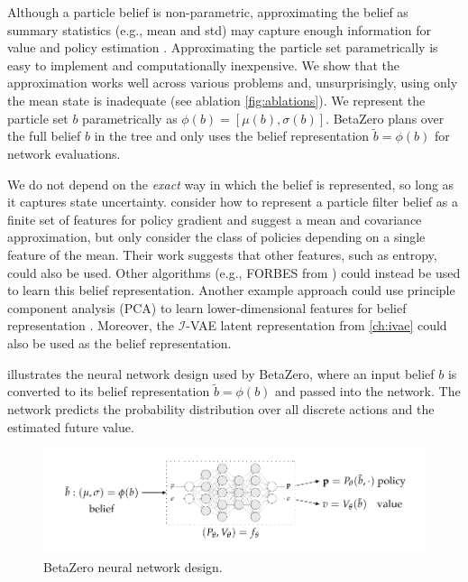 Although a particle belief is non-parametric, approximating the belief as summary statistics (e.g., mean and std) may capture enough information for value and policy estimation \cite{coquelin2008particle}.
Approximating the particle set parametrically is easy to implement and computationally inexpensive.
We show that the approximation works well across various problems and, unsurprisingly, using only the mean state is inadequate (see ablation \cref{fig:ablations}).
We represent the particle set $b$ parametrically as $\phi(b) = [\mu(b), \sigma(b)]$. 
BetaZero plans over the full belief $b$ in the tree and only uses the belief representation $\tilde{b} = \phi(b)$ for network evaluations.

We do not depend on the \textit{exact} way in which the belief is represented, so long as it captures state uncertainty.
\textcite{coquelin2008particle} consider how to represent a particle filter belief as a finite set of features for policy gradient and suggest a mean and covariance approximation, but only consider the class of policies depending on a single feature of the mean.
Their work suggests that other features, such as entropy, could also be used.
Other algorithms (e.g., FORBES from \textcite{chen2022flow}) could instead be used to learn this belief representation.
Another example approach could use principle component analysis (PCA) to learn lower-dimensional features for belief representation \cite{roy2005finding}.
Moreover, the $\mathcal{I}$-VAE latent representation from \cref{ch:ivae} could also be used as the belief representation.

 illustrates the neural network design used by BetaZero, where an input belief $b$ is converted to its belief representation $\tilde{b} = \phi(b)$ and passed into the network.
The network predicts the probability distribution over all discrete actions and the estimated future value.

\begin{figure}[t]
    \centering
    \includegraphics[trim=0 18 0 14, clip, width=0.9\linewidth]{diagrams/betazero/betazero-network.pdf}
    \caption{BetaZero neural network design.}
    \label{fig:betazero-network}
\end{figure}

